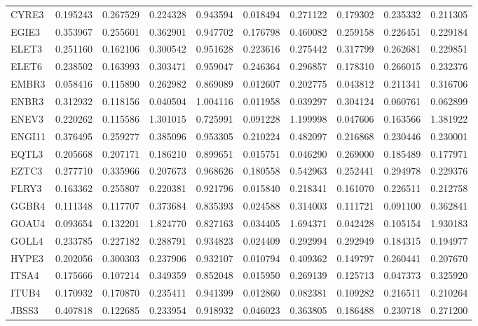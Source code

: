 \begin{tabular}{lrrrrrrrrr}
CYRE3 & 0.195243 & 0.267529 & 0.224328 & 0.943594 & 0.018494 & 0.271122 & 0.179302 & 0.235332 & 0.211305 \\
EGIE3 & 0.353967 & 0.255601 & 0.362901 & 0.947702 & 0.176798 & 0.460082 & 0.259158 & 0.226451 & 0.229184 \\
ELET3 & 0.251160 & 0.162106 & 0.300542 & 0.951628 & 0.223616 & 0.275442 & 0.317799 & 0.262681 & 0.229851 \\
ELET6 & 0.238502 & 0.163993 & 0.303471 & 0.959047 & 0.246364 & 0.296857 & 0.178310 & 0.266015 & 0.232376 \\
EMBR3 & 0.058416 & 0.115890 & 0.262982 & 0.869089 & 0.012607 & 0.202775 & 0.043812 & 0.211341 & 0.316706 \\
ENBR3 & 0.312932 & 0.118156 & 0.040504 & 1.004116 & 0.011958 & 0.039297 & 0.304124 & 0.060761 & 0.062899 \\
ENEV3 & 0.220262 & 0.115586 & 1.301015 & 0.725991 & 0.091228 & 1.199998 & 0.047606 & 0.163566 & 1.381922 \\
ENGI11 & 0.376495 & 0.259277 & 0.385096 & 0.953305 & 0.210224 & 0.482097 & 0.216868 & 0.230446 & 0.230001 \\
EQTL3 & 0.205668 & 0.207171 & 0.186210 & 0.899651 & 0.015751 & 0.046290 & 0.269000 & 0.185489 & 0.177971 \\
EZTC3 & 0.277710 & 0.335966 & 0.207673 & 0.968626 & 0.180558 & 0.542963 & 0.252441 & 0.294978 & 0.229376 \\
FLRY3 & 0.163362 & 0.255807 & 0.220381 & 0.921796 & 0.015840 & 0.218341 & 0.161070 & 0.226511 & 0.212758 \\
GGBR4 & 0.111348 & 0.117707 & 0.373684 & 0.835393 & 0.024588 & 0.314003 & 0.111721 & 0.091100 & 0.362841 \\
GOAU4 & 0.093654 & 0.132201 & 1.824770 & 0.827163 & 0.034405 & 1.694371 & 0.042428 & 0.105154 & 1.930183 \\
GOLL4 & 0.233785 & 0.227182 & 0.288791 & 0.934823 & 0.024409 & 0.292994 & 0.292949 & 0.184315 & 0.194977 \\
HYPE3 & 0.202056 & 0.300303 & 0.237906 & 0.932107 & 0.010794 & 0.409362 & 0.149797 & 0.260441 & 0.207670 \\
ITSA4 & 0.175666 & 0.107214 & 0.349359 & 0.852048 & 0.015950 & 0.269139 & 0.125713 & 0.047373 & 0.325920 \\
ITUB4 & 0.170932 & 0.170870 & 0.235411 & 0.941399 & 0.012860 & 0.082381 & 0.109282 & 0.216511 & 0.210264 \\
JBSS3 & 0.407818 & 0.122685 & 0.233954 & 0.918932 & 0.046023 & 0.363805 & 0.186488 & 0.230718 & 0.271200 \\

\end{tabular}
